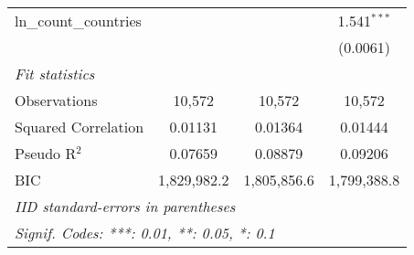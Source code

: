 \begin{tabular}{lccc}
   ln\_count\_countries        &               &                 & 1.541$^{***}$\\   
                               &               &                 & (0.0061)\\   
   \midrule
   \emph{Fit statistics}\\
   Observations                & 10,572        & 10,572          & 10,572\\  
   Squared Correlation         & 0.01131       & 0.01364         & 0.01444\\  
   Pseudo R$^2$                & 0.07659       & 0.08879         & 0.09206\\  
   BIC                         & 1,829,982.2   & 1,805,856.6     & 1,799,388.8\\  
   \midrule \midrule
   \multicolumn{4}{l}{\emph{IID standard-errors in parentheses}}\\
   \multicolumn{4}{l}{\emph{Signif. Codes: ***: 0.01, **: 0.05, *: 0.1}}\\
\end{tabular}
\par\endgroup


